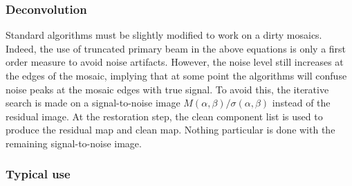 \subsubsection{Deconvolution}

Standard \clean{} algorithms must be slightly modified to work on a dirty
mosaics. Indeed, the use of truncated primary beam in the above equations
is only a first order measure to avoid noise artifacts. However, the noise
level still increases at the edges of the mosaic, implying that at some
point the \clean{} algorithms will confuse noise peaks at the mosaic edges
with true signal. To avoid this, the iterative search is made on a
signal-to-noise image $M(\alpha,\beta)/\sigma(\alpha,\beta)$ instead of the
residual image. At the restoration step, the clean component list is used
to produce the residual map and clean map. Nothing particular is done with
the remaining signal-to-noise image.

\subsubsection{Typical use}

